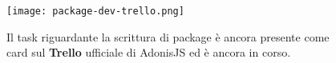     \begin{figure}[h!]
        \centering
        \texttt{[image: package-dev-trello.png]}
        \caption[Card Trello package development AdonisJS]{Il task riguardante la scrittura di package è ancora presente come card sul \textbf{Trello} ufficiale di AdonisJS ed è ancora in corso.}
    \end{figure}